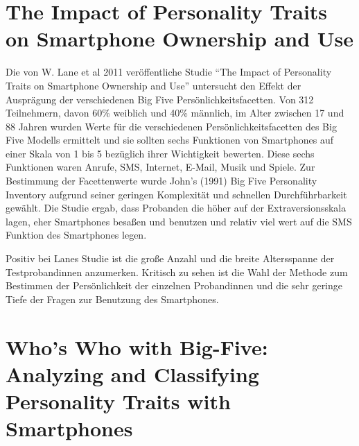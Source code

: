 \section*{The Impact of Personality Traits on Smartphone Ownership and Use}

Die von W. Lane et al 2011 veröffentliche Studie "`The Impact of Personality Traits on Smartphone Ownership and Use"' untersucht den Effekt der Ausprägung der verschiedenen Big Five Persönlichkeitsfacetten.
Von 312 Teilnehmern, davon 60\% weiblich und 40\% männlich, im Alter zwischen 17 und 88 Jahren wurden Werte für die verschiedenen Persönlichkeitsfacetten des Big Five Modells ermittelt und sie sollten sechs Funktionen von Smartphones auf einer Skala von 1 bis 5 bezüglich ihrer Wichtigkeit bewerten.
Diese sechs Funktionen waren Anrufe, SMS, Internet, E-Mail, Musik und Spiele.
Zur Bestimmung der Facettenwerte wurde John's (1991) Big Five Personality Inventory aufgrund seiner geringen Komplexität und schnellen Durchführbarkeit gewählt.
Die Studie ergab, dass Probanden die höher auf der Extraversionsskala lagen, eher Smartphones besaßen und benutzen und relativ viel wert auf die SMS Funktion des Smartphones legen. 
\par
Positiv bei Lanes Studie ist die große Anzahl und die breite Altersspanne der Testprobandinnen anzumerken.
Kritisch zu sehen ist die Wahl der Methode zum Bestimmen der Persönlichkeit der einzelnen Probandinnen und die sehr geringe Tiefe der Fragen zur Benutzung des Smartphones.


\section*{Who’s Who with Big-Five: Analyzing and Classifying Personality Traits with Smartphones}

